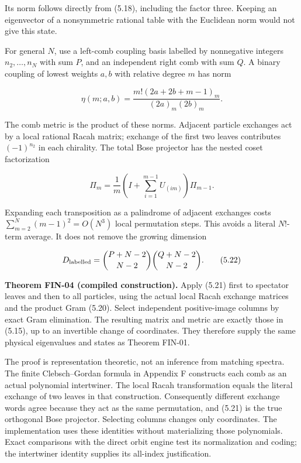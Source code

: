 Its norm follows directly from (5.18), including the factor three. Keeping an eigenvector of a nonsymmetric rational table with the Euclidean norm would not give this state.

For general \(N\), use a left-comb coupling basis labelled by nonnegative integers \(n_2,\ldots,n_N\) with sum \(P\), and an independent right comb with sum \(Q\). A binary coupling of lowest weights \(a,b\) with relative degree \(m\) has norm

\[
\eta(m;a,b)=\frac{m!(2a+2b+m-1)_m}{(2a)_m(2b)_m}.
\tag{5.20}
\]

The comb metric is the product of these norms. Adjacent particle exchanges act by a local rational Racah matrix; exchange of the first two leaves contributes \((-1)^{n_2}\) in each chirality. The total Bose projector has the nested coset factorization

\[
\Pi_m=\frac1m\left(I+\sum_{i=1}^{m-1}U_{(im)}\right)\Pi_{m-1}.
\tag{5.21}
\]

Expanding each transposition as a palindrome of adjacent exchanges costs \(\sum_{m=2}^N(m-1)^2=O(N^3)\) local permutation steps. This avoids a literal \(N!\)-term average. It does not remove the growing dimension

\[
D_{\rm labelled}=\binom{P+N-2}{N-2}\binom{Q+N-2}{N-2}.
\tag{5.22}
\]

\textbf{Theorem FIN-04 (compiled construction).} Apply (5.21) first to spectator leaves and then to all particles, using the actual local Racah exchange matrices and the product Gram (5.20). Select independent positive-image columns by exact Gram elimination. The resulting matrix and metric are exactly those in (5.15), up to an invertible change of coordinates. They therefore supply the same physical eigenvalues and states as Theorem FIN-01.

The proof is representation theoretic, not an inference from matching spectra. The finite Clebsch--Gordan formula in Appendix F constructs each comb as an actual polynomial intertwiner. The local Racah transformation equals the literal exchange of two leaves in that construction. Consequently different exchange words agree because they act as the same permutation, and (5.21) is the true orthogonal Bose projector. Selecting columns changes only coordinates. The implementation uses these identities without materializing those polynomials. Exact comparisons with the direct orbit engine test its normalization and coding; the intertwiner identity supplies its all-index justification.

